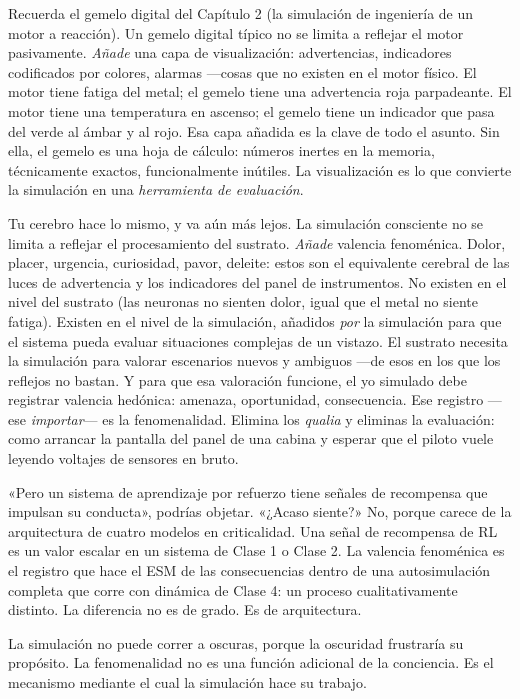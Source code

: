 \documentclass[11pt, twoside, openright]{book}
\begin{document}
Recuerda el gemelo digital del Capítulo 2 (la simulación de ingeniería de un motor a reacción). Un gemelo digital típico no se limita a reflejar el motor pasivamente. \textit{Añade} una capa de visualización: advertencias, indicadores codificados por colores, alarmas ---cosas que no existen en el motor físico. El motor tiene fatiga del metal; el gemelo tiene una advertencia roja parpadeante. El motor tiene una temperatura en ascenso; el gemelo tiene un indicador que pasa del verde al ámbar y al rojo. Esa capa añadida es la clave de todo el asunto. Sin ella, el gemelo es una hoja de cálculo: números inertes en la memoria, técnicamente exactos, funcionalmente inútiles. La visualización es lo que convierte la simulación en una \textit{herramienta de evaluación}.

Tu cerebro hace lo mismo, y va aún más lejos. La simulación consciente no se limita a reflejar el procesamiento del sustrato. \textit{Añade} valencia fenoménica. Dolor, placer, urgencia, curiosidad, pavor, deleite: estos son el equivalente cerebral de las luces de advertencia y los indicadores del panel de instrumentos. No existen en el nivel del sustrato (las neuronas no sienten dolor, igual que el metal no siente fatiga). Existen en el nivel de la simulación, añadidos \textit{por} la simulación para que el sistema pueda evaluar situaciones complejas de un vistazo. El sustrato necesita la simulación para valorar escenarios nuevos y ambiguos ---de esos en los que los reflejos no bastan. Y para que esa valoración funcione, el yo simulado debe registrar valencia hedónica: amenaza, oportunidad, consecuencia. Ese registro ---ese \textit{importar}--- es la fenomenalidad. Elimina los \textit{qualia} y eliminas la evaluación: como arrancar la pantalla del panel de una cabina y esperar que el piloto vuele leyendo voltajes de sensores en bruto.

«Pero un sistema de aprendizaje por refuerzo tiene señales de recompensa que impulsan su conducta», podrías objetar. «¿Acaso siente?» No, porque carece de la arquitectura de cuatro modelos en criticalidad. Una señal de recompensa de RL es un valor escalar en un sistema de Clase 1 o Clase 2. La valencia fenoménica es el registro que hace el ESM de las consecuencias dentro de una autosimulación completa que corre con dinámica de Clase 4: un proceso cualitativamente distinto. La diferencia no es de grado. Es de arquitectura.

La simulación no puede correr a oscuras, porque la oscuridad frustraría su propósito. La fenomenalidad no es una función adicional de la conciencia. Es el mecanismo mediante el cual la simulación hace su trabajo.
\end{document}
